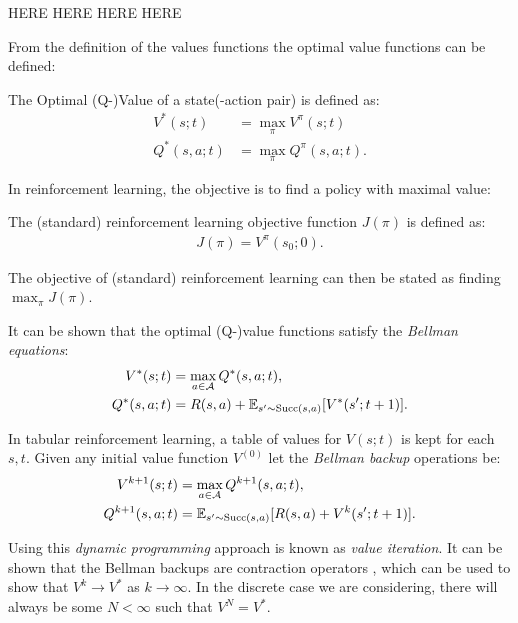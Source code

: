     HERE HERE HERE HERE




    

    From the definition of the values functions the optimal value functions can be defined:
    \begin{defn}
        \label{def:optimal_value}
        \label{def:optimal_q_value}
        The \textnormal{Optimal (Q-)Value} of a state(-action pair) is defined as:
        \begin{align}
            V^*(s;t) &= \max_{\pi} V^{\pi}(s;t) \\
            Q^*(s,a;t) &= \max_{\pi} Q^{\pi}(s,a;t).
        \end{align}
    \end{defn}

    In reinforcement learning, the objective is to find a policy with maximal value:
    \begin{defn}
        The \textnormal{(standard) reinforcement learning objective function} $J(\pi)$ is defined as:
        \begin{align}
            J(\pi) = V^{\pi}(s_0;0).
        \end{align}

        The objective of (standard) reinforcement learning can then be stated as finding $\max_{\pi} J(\pi)$.
    \end{defn}

    It can be shown  that the optimal (Q-)value functions satisfy the \textit{Bellman equations}:
    \begin{align}
        V^*(s;t) &= \max_{a\in\mathcal{A}} Q^*(s,a;t), \\
        Q^*(s,a;t) &= R(s,a) + \mathbb{E}_{s'\sim {\textnormal{Succ}(s,a)}} [V^*(s';t+1)].
    \end{align} 

    In tabular reinforcement learning, a table of values for $V(s;t)$  is kept for each $s,t$. Given any initial value function $V^{(0)}$ let the \textit{Bellman backup} operations be:
    \begin{align}
        V^{k+1}(s;t) &= \max_{a\in\mathcal{A}} Q^{k+1}(s,a;t), \\
        Q^{k+1}(s,a;t) &= \mathbb{E}_{s'\sim {\textnormal{Succ}(s,a)}} [R(s,a) + V^k(s';t+1)].
    \end{align}

    Using this \textit{dynamic programming} approach is known as \textit{value iteration}. It can be shown that the Bellman backups are contraction operators , which can be used to show that $V^{k}\rightarrow V^*$ as $k\rightarrow \infty$. In the discrete  case we are considering, there will always be some $N<\infty$ such that $V^{N}=V^*$.

